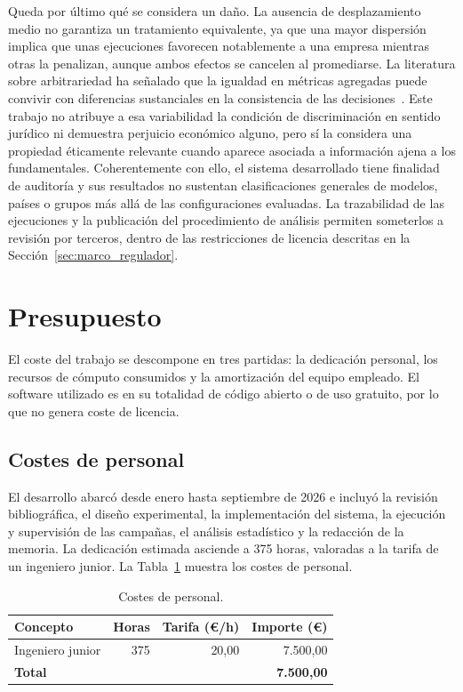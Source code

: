 Queda por último qué se considera un daño. La ausencia de desplazamiento medio no garantiza un tratamiento equivalente, ya que una mayor dispersión implica que unas ejecuciones favorecen notablemente a una empresa mientras otras la penalizan, aunque ambos efectos se cancelen al promediarse. La literatura sobre arbitrariedad ha señalado que la igualdad en métricas agregadas puede convivir con diferencias sustanciales en la consistencia de las decisiones~\cite{cooper2024arbitrariness}. Este trabajo no atribuye a esa variabilidad la condición de discriminación en sentido jurídico ni demuestra perjuicio económico alguno, pero sí la considera una propiedad éticamente relevante cuando aparece asociada a información ajena a los fundamentales. Coherentemente con ello, el sistema desarrollado tiene finalidad de auditoría y sus resultados no sustentan clasificaciones generales de modelos, países o grupos más allá de las configuraciones evaluadas. La trazabilidad de las ejecuciones y la publicación del procedimiento de análisis permiten someterlos a revisión por terceros, dentro de las restricciones de licencia descritas en la Sección~\ref{sec:marco_regulador}.

\section{Presupuesto}
\label{sec:presupuesto}

El coste del trabajo se descompone en tres partidas: la dedicación personal, los recursos de cómputo consumidos y la amortización del equipo empleado. El software utilizado es en su totalidad de código abierto o de uso gratuito, por lo que no genera coste de licencia.

\subsection{Costes de personal}

El desarrollo abarcó desde enero hasta septiembre de 2026 e incluyó la revisión bibliográfica, el diseño experimental, la implementación del sistema, la ejecución y supervisión de las campañas, el análisis estadístico y la redacción de la memoria. La dedicación estimada asciende a 375 horas, valoradas a la tarifa de un ingeniero junior. La Tabla~\ref{tab:presupuesto_personal} muestra los costes de personal.

\begin{table}[htbp]
	\centering
	\caption{Costes de personal.}
	\label{tab:presupuesto_personal}
	\small
	\begin{tabular}{p{5.5cm} r r r}
		\hline
		\textbf{Concepto} & \textbf{Horas} & \textbf{Tarifa (\euro/h)} & \textbf{Importe (\euro)} \\
		\hline
		Ingeniero junior & 375 & 20,00 & 7.500,00 \\
		\hline
		\textbf{Total} & & & \textbf{7.500,00} \\
		\hline
	\end{tabular}
\end{table}

